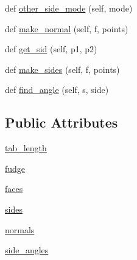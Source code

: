 \begin{DoxyCompactItemize}
\item 
def \hyperlink{classboxes_1_1_arbitrary_box_af1a76bf23428a71336ab686f48289f3e}{other\+\_\+side\+\_\+mode} (self, mode)
\item 
def \hyperlink{classboxes_1_1_arbitrary_box_a1ad0b3dbea620c916110d96ffe3e5215}{make\+\_\+normal} (self, f, points)
\item 
def \hyperlink{classboxes_1_1_arbitrary_box_adf41d3530e41e25bc1ccff538614f628}{get\+\_\+sid} (self, p1, p2)
\item 
def \hyperlink{classboxes_1_1_arbitrary_box_aa9df9c5a4d54b25df51f3787f4a51e94}{make\+\_\+sides} (self, f, points)
\item 
def \hyperlink{classboxes_1_1_arbitrary_box_ab10aa86f8c971fd656e75da2491d7422}{find\+\_\+angle} (self, s, side)
\end{DoxyCompactItemize}
\subsection*{Public Attributes}
\begin{DoxyCompactItemize}
\item 
\hyperlink{classboxes_1_1_arbitrary_box_aa3f4f131456dc23999d99a422041c842}{tab\+\_\+length}
\item 
\hyperlink{classboxes_1_1_arbitrary_box_af7c0c8c6ebca710aa27785317764f8d3}{fudge}
\item 
\hyperlink{classboxes_1_1_arbitrary_box_ab67b4c269874e7134565eb3338355e3d}{faces}
\item 
\hyperlink{classboxes_1_1_arbitrary_box_a3c4f3f9e42118cbe79d0d8be915bfe4f}{sides}
\item 
\hyperlink{classboxes_1_1_arbitrary_box_aa4c61dd48b10ff63eb8f4889d55934f6}{normals}
\item 
\hyperlink{classboxes_1_1_arbitrary_box_a26b3d077741f59e0f58fa8b6307d1958}{side\+\_\+angles}
\end{DoxyCompactItemize}
